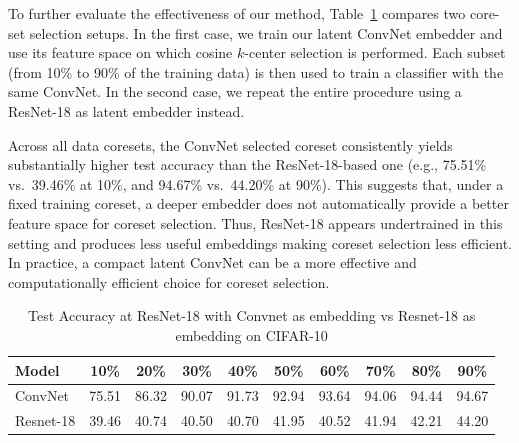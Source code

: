 \documentclass{article}
\begin{document}
To further evaluate the effectiveness of our method, Table~\ref{tab:conv_vs_res_emb} compares two core-set selection setups.
In the first case, we train our latent ConvNet embedder and use its feature space on
which cosine $k$-center selection is performed. 
Each subset (from 10\% to 90\% of the training data) is then used to train a classifier with the same ConvNet. 
In the second case, we repeat the entire procedure using a ResNet-18 as latent embedder instead.

Across all data coresets, the ConvNet selected coreset consistently yields substantially 
higher test accuracy than the ResNet-18-based one (e.g., 75.51\% vs.\ 39.46\% at 10\%,
and 94.67\% vs.\ 44.20\% at 90\%). 
This suggests that, under a fixed training coreset, a deeper embedder does not 
automatically provide a better feature space for coreset selection.
Thus, ResNet-18 appears undertrained in this setting and produces less useful embeddings 
making coreset selection less efficient. 
In practice, a compact latent ConvNet can be a more effective and computationally efficient 
choice for coreset selection.



\begin{table}[t]
    \centering
    \caption{Test Accuracy at ResNet-18 with Convnet as embedding vs Resnet-18 as embedding on CIFAR-10}
    \label{tab:conv_vs_res_emb}
    \begin{tabular}{lccccccccc}
        \toprule
        \textbf{Model} & \textbf{10\%} & \textbf{20\%} & \textbf{30\%} & \textbf{40\%} & \textbf{50\%} & \textbf{60\%} & \textbf{70\%} & \textbf{80\%} & \textbf{90\%} \\
        \midrule
        ConvNet & 75.51 &  86.32  & 90.07 &  91.73 &  92.94 &  93.64  & 94.06  & 94.44  & 94.67\\
        Resnet-18 & 39.46 & 40.74 &40.50 &40.70& 41.95& 40.52& 41.94 & 42.21 & 44.20 \\
        \bottomrule
    \end{tabular}
\end{table}


\end{document}
